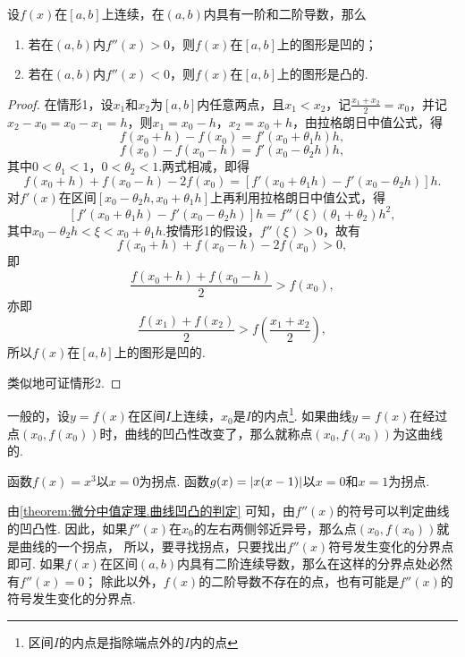 \begin{theorem}[曲线凹凸的判定]\label{theorem:微分中值定理.曲线凹凸的判定}
设\(f(x)\)在\([a,b]\)上连续，在\((a,b)\)内具有一阶和二阶导数，那么
\begin{enumerate}
\item 若在\((a,b)\)内\(f''(x)>0\)，则\(f(x)\)在\([a,b]\)上的图形是凹的；
\item 若在\((a,b)\)内\(f''(x)<0\)，则\(f(x)\)在\([a,b]\)上的图形是凸的.
\end{enumerate}
\begin{proof}
在情形1，设\(x_1\)和\(x_2\)为\([a,b]\)内任意两点，且\(x_1 < x_2\)，记\(\frac{x_1 + x_2}{2} = x_0\)，并记\(x_2 - x_0 = x_0 - x_1 = h\)，则\(x_1 = x_0 - h\)，\(x_2 = x_0 + h\)，由拉格朗日中值公式，得\[
f(x_0 + h) - f(x_0) = f'(x_0 + \theta_1 h) h,
\]\[
f(x_0) - f(x_0 - h) = f'(x_0 - \theta_2 h) h,
\]其中\(0 < \theta_1 < 1\)，\(0 < \theta_2 < 1\).两式相减，即得\[
f(x_0 + h) + f(x_0 - h) - 2 f(x_0)
= [ f'(x_0 + \theta_1 h) - f'(x_0 - \theta_2 h) ] h.
\]对\(f'(x)\)在区间\([x_0 - \theta_2 h,x_0 + \theta_1 h]\)上再利用拉格朗日中值公式，得\[
[ f'(x_0 + \theta_1 h) - f'(x_0 - \theta_2 h) ] h
= f''(\xi) (\theta_1 + \theta_2) h^2,
\]其中\(x_0 - \theta_2 h < \xi < x_0 + \theta_1 h\).按情形1的假设，\(f''(\xi) > 0\)，故有\[
f(x_0 + h) + f(x_0 - h) - 2 f(x_0) > 0,
\]即\[
\frac{f(x_0 + h) + f(x_0 - h)}{2} > f(x_0),
\]亦即\[
\frac{f(x_1) + f(x_2)}{2} > f\left(\frac{x_1 + x_2}{2}\right),
\]所以\(f(x)\)在\([a,b]\)上的图形是凹的.

类似地可证情形2.
\end{proof}
\end{theorem}

\begin{definition}
一般的，设\(y=f(x)\)在区间\(I\)上连续，\(x_0\)是\(I\)的内点\footnote{区间\(I\)的内点是指除端点外的\(I\)内的点}.
如果曲线\(y=f(x)\)在经过点\((x_0,f(x_0))\)时，曲线的凹凸性改变了，那么就称点\((x_0,f(x_0))\)为这曲线的.
\end{definition}

\begin{example}
函数\(f(x) = x^3\)以\(x=0\)为拐点.
函数\(g(x) = \abs{x(x-1)}\)以\(x=0\)和\(x=1\)为拐点.
\end{example}

由\cref{theorem:微分中值定理.曲线凹凸的判定} 可知，由\(f''(x)\)的符号可以判定曲线的凹凸性.
因此，如果\(f''(x)\)在\(x_0\)的左右两侧邻近异号，那么点\((x_0,f(x_0))\)就是曲线的一个拐点，
所以，要寻找拐点，只要找出\(f''(x)\)符号发生变化的分界点即可.
如果\(f(x)\)在区间\((a,b)\)内具有二阶连续导数，那么在这样的分界点处必然有\(f''(x)=0\)；
除此以外，\(f(x)\)的二阶导数不存在的点，也有可能是\(f''(x)\)的符号发生变化的分界点.

